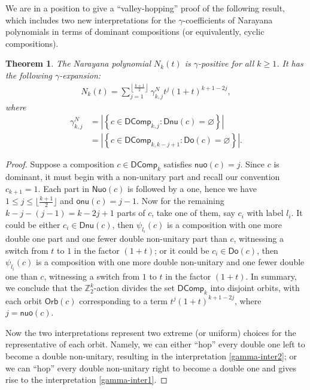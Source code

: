 \documentclass[reqno]{amsart}
\numberwithin{equation}{section}
\newtheorem{theorem}{Theorem}[section]
\theoremstyle{definition}
\theoremstyle{named}
\newcommand{\abs}[1]{\left|#1\right|}
\newcommand{\set}[1]{\left\{#1\right\}}
\newcommand{\bZ}{\mathbb{Z}}
\def\DComp{\mathsf{DComp}}
\def\Nuo{\mathsf{Nuo}}
\def\Dnu{\mathsf{Dnu}}
\def\Do{\mathsf{Do}}
\def\nuo{\mathsf{nuo}}
\def\onu{\mathsf{onu}}
\def\Orb{\mathsf{Orb}}
\begin{document}
We are in a position to give a ``valley-hopping'' proof of the following result, which includes two new interpretations for the $\gamma$-coefficients of Narayana polynomials in terms of dominant compositions (or equivalently, cyclic compositions).
\begin{theorem}
The Narayana polynomial $N_k(t)$ is $\gamma$-positive for all $k \ge 1$. It has the following $\gamma$-expansion:
\begin{align}
N_k(t)=\sum_{j=1}^{\left \lfloor \frac{k+1}{2} \right \rfloor } \gamma^{N}_{k,j} t^j(1+t)^{k+1-2j} ,
\end{align}
where
\begin{align}
\label{gamma-inter1}
\gamma^{N}_{k,j}&=\abs{\set{c\in \DComp_{k,j} : \Dnu(c)=\varnothing}}\\
&=\abs{\set{c\in \DComp_{k,k-j+1} : \Do(c)=\varnothing}}.\label{gamma-inter2}
\end{align}
\end{theorem}
\begin{proof}
Suppose a composition $c\in\DComp_k$ satisfies $\nuo(c)=j$. Since $c$ is dominant, it must begin with a non-unitary part and recall our convention $c_{k+1}=1$. Each part in $\Nuo(c)$ is followed by a one, hence we have $1\le j\le \lfloor\frac{k+1}{2}\rfloor$ and $\onu(c)=j-1$. Now for the remaining $k-j-(j-1)=k-2j+1$ parts of $c$, take one of them, say $c_i$ with label $l_i$. It could be either $c_i\in\Dnu(c)$, then $\psi_{l_i}(c)$ is a composition with one more double one part and one fewer double non-unitary part than $c$, witnessing a switch from $t$ to $1$ in the factor $(1+t)$; or it could be $c_i\in\Do(c)$, then $\psi_{l_i}(c)$ is a composition with one more double non-unitary and one fewer double one than $c$, witnessing a switch from $1$ to $t$ in the factor $(1+t)$. In summary, we conclude that the $\bZ^k_2$-action divides the set $\DComp_k$ into disjoint orbits, with each orbit $\Orb(c)$ corresponding to a term $t^j(1+t)^{k+1-2j}$, where $j=\nuo(c)$. 

Now the two interpretations represent two extreme (or uniform) choices for the representative of each orbit. Namely, we can either ``hop'' every double one left to become a double non-unitary, resulting in the interpretation \eqref{gamma-inter2}; or we can ``hop'' every double non-unitary right to become a double one and gives rise to the interpretation \eqref{gamma-inter1}.





\end{proof} 
\end{document}

